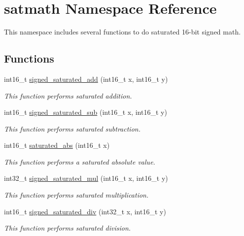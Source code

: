 \hypertarget{namespacesatmath}{\section{satmath Namespace Reference}
\label{namespacesatmath}
}


This namespace includes several functions to do saturated 16-\/bit signed math.  


\subsection*{Functions}
\begin{DoxyCompactItemize}
\item 
int16\-\_\-t \hyperlink{namespacesatmath_a18492afde0ef3b9937ca54c69139f93a}{signed\-\_\-saturated\-\_\-add} (int16\-\_\-t x, int16\-\_\-t y)
\begin{DoxyCompactList}\small\item\em This function performs saturated addition. \end{DoxyCompactList}\item 
int16\-\_\-t \hyperlink{namespacesatmath_adcfbde52256a183d24c532674d609384}{signed\-\_\-saturated\-\_\-sub} (int16\-\_\-t x, int16\-\_\-t y)
\begin{DoxyCompactList}\small\item\em This function performs saturated subtraction. \end{DoxyCompactList}\item 
int16\-\_\-t \hyperlink{namespacesatmath_aa1edc644596ce763e0463ab7197687b3}{saturated\-\_\-abs} (int16\-\_\-t x)
\begin{DoxyCompactList}\small\item\em This function performs a saturated absolute value. \end{DoxyCompactList}\item 
int32\-\_\-t \hyperlink{namespacesatmath_a74a833d78f719a042a91a752fb599dcc}{signed\-\_\-saturated\-\_\-mul} (int16\-\_\-t x, int16\-\_\-t y)
\begin{DoxyCompactList}\small\item\em This function performs saturated multiplication. \end{DoxyCompactList}\item 
int16\-\_\-t \hyperlink{namespacesatmath_ab23f0cef1977e2a1e7880a0ed4d5d61d}{signed\-\_\-saturated\-\_\-div} (int32\-\_\-t x, int16\-\_\-t y)
\begin{DoxyCompactList}\small\item\em This function performs saturated division. \end{DoxyCompactList}\end{DoxyCompactItemize}


